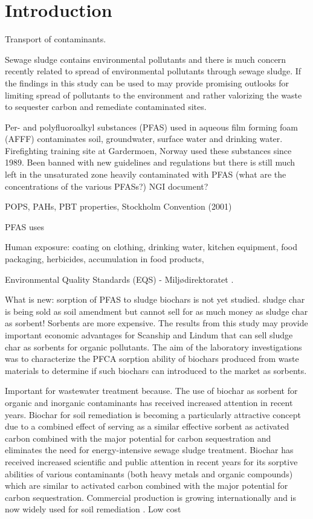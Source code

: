 \chapter{Introduction}\label{chap:intro}

Transport of contaminants.

Sewage sludge contains environmental pollutants and there is much concern recently related to spread of environmental pollutants through sewage sludge. If the findings in this study can be used to may provide promising outlooks for limiting spread of pollutants to the environment and rather valorizing the waste to sequester carbon and remediate contaminated sites.

Per- and polyfluoroalkyl substances (PFAS) used in aqueous film forming foam (AFFF) contaminates soil, groundwater, surface water and drinking water. Firefighting training site at Gardermoen, Norway used these substances since 1989. Been banned with new guidelines and regulations but there is still much left in the unsaturated zone heavily contaminated with PFAS (what are the concentrations of the various PFASs?) NGI document? 

POPS, PAHs, PBT properties, Stockholm Convention (2001)

PFAS uses

Human exposure: coating on clothing, drinking water, kitchen equipment, food packaging, herbicides, accumulation in food products, 

Environmental Quality Standards (EQS) - Miljødirektoratet \citep{EC2020PFAS}. \citep{MD2016workshop} \citep{MD2020EQS}

What is new: sorption of PFAS to sludge biochars is not yet studied. sludge char is being sold as soil amendment but cannot sell for as much money as sludge char as sorbent! Sorbents are more expensive. The results from this study may provide important economic advantages for Scanship and Lindum that can sell sludge char as sorbents for organic pollutants. The aim of the laboratory investigations was to characterize the PFCA sorption ability of biochars produced from waste materials to determine if such biochars can introduced to the market as sorbents. 

Important for wastewater treatment because. The use of biochar as sorbent for organic and inorganic contaminants has received increased attention in recent years. Biochar for soil remediation is becoming a particularly attractive concept due to a combined effect of serving as a similar effective sorbent as activated carbon combined with the major potential for carbon sequestration and eliminates the need for energy-intensive sewage sludge treatment. Biochar has received increased scientific and public attention in recent years for its sorptive abilities of various contaminants (both heavy metals and organic compounds) which are similar to activated carbon combined with the major potential for carbon sequestration. Commercial production is growing internationally and is now widely used for soil remediation \citep{Ahmad2014}. Low cost

